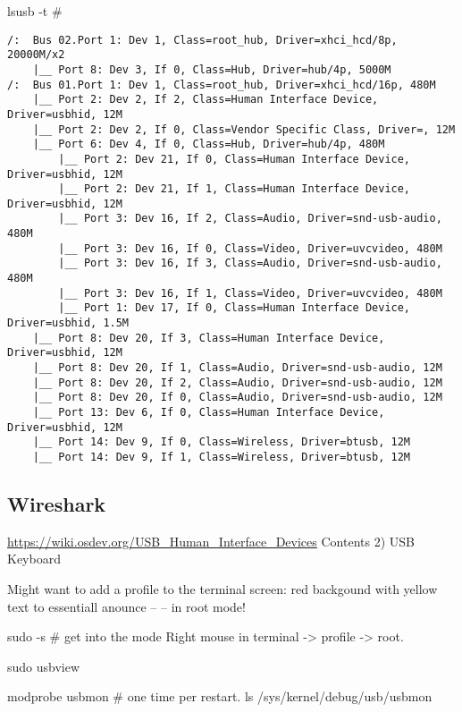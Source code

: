 lsusb -t #
\begingroup \fontsize{10pt}{10pt}
\selectfont
\begin{verbatim} 
/:  Bus 02.Port 1: Dev 1, Class=root_hub, Driver=xhci_hcd/8p, 20000M/x2
    |__ Port 8: Dev 3, If 0, Class=Hub, Driver=hub/4p, 5000M
/:  Bus 01.Port 1: Dev 1, Class=root_hub, Driver=xhci_hcd/16p, 480M
    |__ Port 2: Dev 2, If 2, Class=Human Interface Device, Driver=usbhid, 12M
    |__ Port 2: Dev 2, If 0, Class=Vendor Specific Class, Driver=, 12M
    |__ Port 6: Dev 4, If 0, Class=Hub, Driver=hub/4p, 480M
        |__ Port 2: Dev 21, If 0, Class=Human Interface Device, Driver=usbhid, 12M
        |__ Port 2: Dev 21, If 1, Class=Human Interface Device, Driver=usbhid, 12M
        |__ Port 3: Dev 16, If 2, Class=Audio, Driver=snd-usb-audio, 480M
        |__ Port 3: Dev 16, If 0, Class=Video, Driver=uvcvideo, 480M
        |__ Port 3: Dev 16, If 3, Class=Audio, Driver=snd-usb-audio, 480M
        |__ Port 3: Dev 16, If 1, Class=Video, Driver=uvcvideo, 480M
        |__ Port 1: Dev 17, If 0, Class=Human Interface Device, Driver=usbhid, 1.5M
    |__ Port 8: Dev 20, If 3, Class=Human Interface Device, Driver=usbhid, 12M
    |__ Port 8: Dev 20, If 1, Class=Audio, Driver=snd-usb-audio, 12M
    |__ Port 8: Dev 20, If 2, Class=Audio, Driver=snd-usb-audio, 12M
    |__ Port 8: Dev 20, If 0, Class=Audio, Driver=snd-usb-audio, 12M
    |__ Port 13: Dev 6, If 0, Class=Human Interface Device, Driver=usbhid, 12M
    |__ Port 14: Dev 9, If 0, Class=Wireless, Driver=btusb, 12M
    |__ Port 14: Dev 9, If 1, Class=Wireless, Driver=btusb, 12M
\end{verbatim}
\endgroup

\subsection{Wireshark}

\url{https://wiki.osdev.org/USB_Human_Interface_Devices}
Contents 2) USB Keyboard

Might want to add a profile to the terminal screen: red backgound with
yellow text to essentiall anounce --  -- in root mode!

sudo -s  # get into the mode
Right mouse in terminal -> profile -> root.

 sudo usbview


modprobe usbmon # one time per restart.
ls /sys/kernel/debug/usb/usbmon

